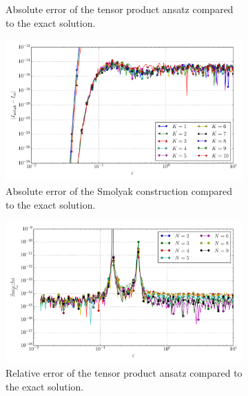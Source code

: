 \documentclass[a4paper,10pt]{article}
\begin{document}
\begin{figure}[ht!]
\begin{subfigure}[t]{0.5\linewidth}
    \caption{Absolute error of the tensor product ansatz compared to the exact solution.}
    \label{fig:tp_sg_3d_conv_p_222_222_err_nsd_tp}
  \end{subfigure}
  \begin{subfigure}[t]{0.5\linewidth}
    \includegraphics[width=\linewidth]{./plots/tp_sg_3d_conv_eps_(2,2,2)_(2,2,2)_err_nsd_gk.pdf}
    \caption{Absolute error of the Smolyak construction compared to the exact solution.}
    \label{fig:tp_sg_3d_conv_p_222_222_err_nsd_gk}
  \end{subfigure}
  \begin{subfigure}[t]{0.5\linewidth}
    \includegraphics[width=\linewidth]{./plots/tp_sg_3d_conv_eps_(2,2,2)_(2,2,2)_err_rel_nsd_tp.pdf}
    \caption{Relative error of the tensor product ansatz compared to the exact solution.}
    \label{fig:tp_sg_3d_conv_p_222_222_err_rel_nsd_tp}
  \end{subfigure}
  \begin{subfigure}[t]{0.5\linewidth}

\end{subfigure}
\end{figure}
\end{document}
